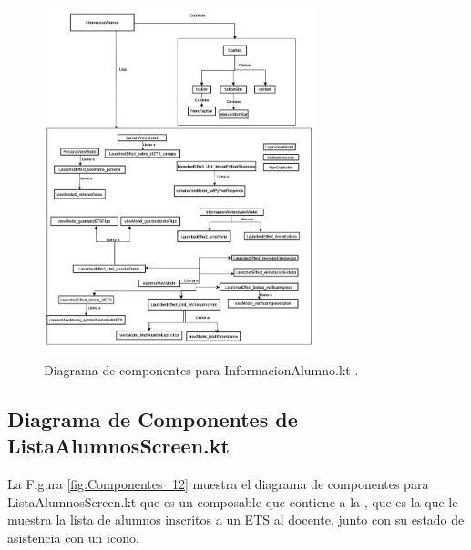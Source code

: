 \begin{figure}[htbp!]
	\begin{center}
		\includegraphics[width=0.7\textwidth]{DiagramasMoviles/DCM (24)}
		\caption{Diagrama de componentes para InformacionAlumno.kt .}
		\label{fig:Componentes_11}
	\end{center}
\end{figure}

\newpage

\subsection{Diagrama de Componentes de ListaAlumnosScreen.kt}

La Figura \ref{fig:Componentes_12} muestra el diagrama de componentes para ListaAlumnosScreen.kt que es un composable que contiene a la , que es la que le muestra la lista de alumnos inscritos a un ETS al docente, junto con su estado de asistencia con un icono.

